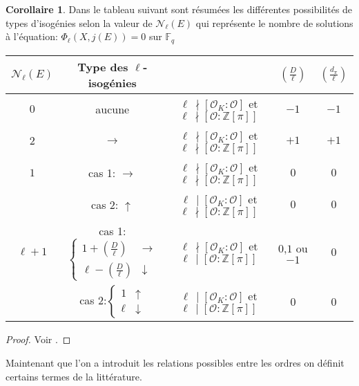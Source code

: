 \documentclass[10pt,a4paper]{book}
\theoremstyle{plain}
\theoremstyle{definition}
\theoremstyle{definition}
\newtheorem{cor}[thm]{Corollaire}
\theoremstyle{definition}
\theoremstyle{definition}
\theoremstyle{remark}
\theoremstyle{remark}
\theoremstyle{definition}
\begin{document}
\begin{cor}
\label{cor:tab:vol} 
Dans le tableau suivant sont résumées les différentes possibilités de types d'isogénies selon la valeur de $\mathcal{N}_{\ell}(E)$ qui représente le nombre de solutions à l'équation: $\Phi_{\ell}(X,j(E))=0$ sur $\mathbb{F}_q$
\newline
\begin{tabular}{|c|c|c|c|c|}
\hline 
$\mathcal{N}_{\ell}(E)$ & Type des $\ell$-isogénies &  & $\left(\frac{D}{\ell}\right)$ & $\left(\frac{d_{\pi}}{\ell}\right)$\tabularnewline
\hline 
\hline 
$0$ & aucune & $\ell \,\nmid[\mathcal{O}_{K}:\mathcal{O}]$ et $\ell \,\nmid[\mathcal{O}:\mathbb{Z}[\pi]]$  & $-1$ & $-1$\\
\hline 
$2$ & $\rightarrow$ & $\ell \,\nmid[\mathcal{O}_{K}:\mathcal{O}]$ et $\ell \,\nmid[\mathcal{O}:\mathbb{Z}[\pi]]$  & $+1$ & $+1$\\
\hline 
$1$ & cas 1: $\rightarrow$ & $\ell\,\nmid[\mathcal{O}_{K}:\mathcal{O}]$ et $\ell\,\nmid[\mathcal{O}:\mathbb{Z}[\pi]]$  & $0$ & $0$\\

\cline{2-5} & cas 2: $\uparrow$ & $\ell\,\mid[\mathcal{O}_{K}:\mathcal{O}]$ et $\ell\,\nmid[\mathcal{O}:\mathbb{Z}[\pi]]$  & $0$ & $0$\\
\hline 
$\ell+1$ & cas 1:$\left\{ \begin{array}{cc}
1+\left(\frac{D}{\ell}\right) & \rightarrow\\
\ell-\left(\frac{D}{\ell}\right) & \downarrow
\end{array}\right.$ & $\ell \,\nmid[\mathcal{O}_{K}:\mathcal{O}]$ et $\ell \,\mid[\mathcal{O}:\mathbb{Z}[\pi]]$  & $0$,$1$ ou $-1$ & $0$\\
 
\cline{2-5} & cas 2:$\left\{ \begin{array}{cc}
1 & \uparrow\\
\ell & \downarrow
\end{array}\right.$ & $\ell \,\mid[\mathcal{O}_{K}:\mathcal{O}]$ et $\ell \,\mid[\mathcal{O}:\mathbb{Z}[\pi]]$  & $0$ & $0$ \\
\hline 
\end{tabular}
\end{cor}

\begin{proof}
Voir \cite[§2.3]{FouquetMorain02}.
\end{proof}

Maintenant que l'on a introduit les relations possibles entre les ordres on définit certains termes de la littérature.
\end{document}
